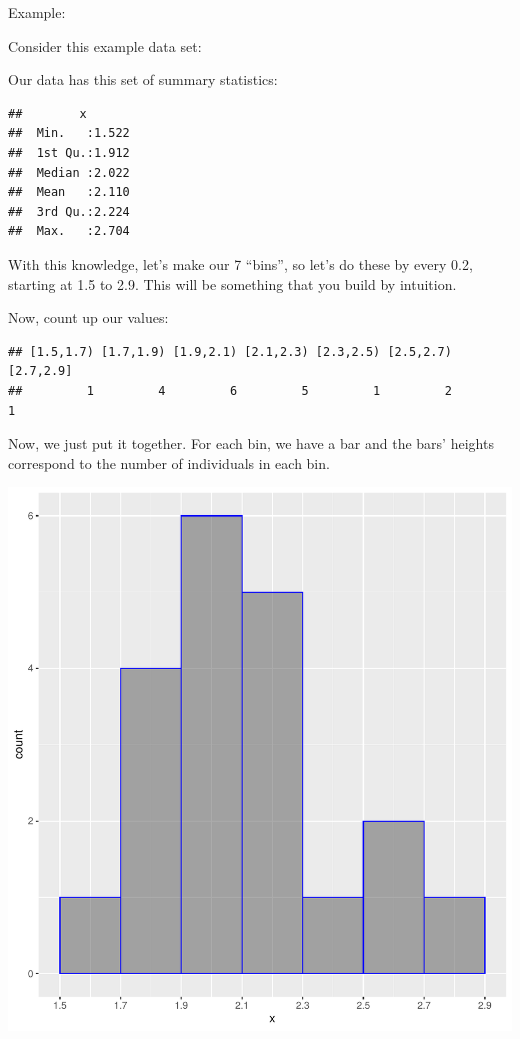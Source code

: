\documentclass[
]{book}
\theoremstyle{definition}
\theoremstyle{definition}
\theoremstyle{definition}
\theoremstyle{definition}
\theoremstyle{remark}
\begin{document}
Example:

Consider this example data set:

Our data has this set of summary statistics:

\begin{verbatim}
##        x        
##  Min.   :1.522  
##  1st Qu.:1.912  
##  Median :2.022  
##  Mean   :2.110  
##  3rd Qu.:2.224  
##  Max.   :2.704
\end{verbatim}

With this knowledge, let's make our 7 ``bins'', so let's do these by every
0.2, starting at 1.5 to 2.9. This will be something that you build by
intuition.

Now, count up our values:

\begin{verbatim}
## [1.5,1.7) [1.7,1.9) [1.9,2.1) [2.1,2.3) [2.3,2.5) [2.5,2.7) [2.7,2.9] 
##         1         4         6         5         1         2         1
\end{verbatim}

Now, we just put it together. For each bin, we have a bar and the bars'
heights correspond to the number of individuals in each bin.

\includegraphics{_main_files/figure-latex/unnamed-chunk-30-1.pdf}
\end{document}
